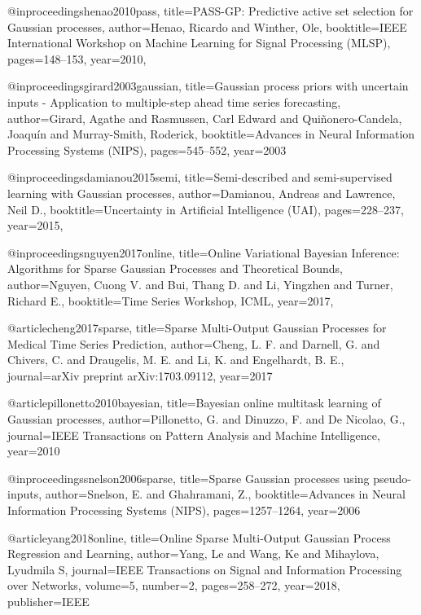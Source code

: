 \documentclass[]{article}
\begin{document}
@inproceedings{henao2010pass,
	title={{PASS-GP}: {P}redictive active set selection for {G}aussian processes},
	author={Henao, Ricardo and Winther, Ole},
	booktitle={IEEE International Workshop on Machine Learning for Signal Processing (MLSP)},
	pages={148--153},
	year={2010},
}

@inproceedings{girard2003gaussian,
	title={{G}aussian process priors with uncertain inputs - {A}pplication to multiple-step ahead time series forecasting},
	author={Girard, Agathe and Rasmussen, Carl Edward and Qui\~nonero-Candela, Joaqu\'in and Murray-Smith, Roderick},
	booktitle={Advances in Neural Information Processing Systems (NIPS)},
	pages={545--552},
	year={2003}
}

@inproceedings{damianou2015semi,
	title={{S}emi-described and semi-supervised learning with {G}aussian processes},
	author={Damianou, Andreas and Lawrence, Neil D.},
	booktitle={Uncertainty in Artificial Intelligence (UAI)},
	pages={228--237},
	year={2015},
}

@inproceedings{nguyen2017online,
	title={{O}nline Variational {B}ayesian Inference: Algorithms for Sparse {G}aussian Processes and Theoretical Bounds},
	author={Nguyen, Cuong V. and Bui, Thang D. and Li, Yingzhen and Turner, Richard E.},
	booktitle={Time Series Workshop, ICML},
	year={2017},
}

@article{cheng2017sparse,
	title={Sparse Multi-Output {G}aussian Processes for Medical Time Series Prediction},
	author={Cheng, L. F. and Darnell, G. and Chivers, C. and Draugelis, M. E. and Li, K. and Engelhardt, B. E.},
	journal={arXiv preprint arXiv:1703.09112},
	year={2017}
}

@article{pillonetto2010bayesian,
	title={{B}ayesian online multitask learning of {G}aussian processes},
	author={Pillonetto, G. and Dinuzzo, F. and De Nicolao, G.},
	journal={IEEE Transactions on Pattern Analysis and Machine Intelligence},
	year={2010}
}

@inproceedings{snelson2006sparse,
	title={{S}parse {G}aussian processes using pseudo-inputs},
	author={Snelson, E. and Ghahramani, Z.},
	booktitle={Advances in Neural Information Processing Systems (NIPS)},
	pages={1257--1264},
	year={2006}
}

@article{yang2018online,
	title={Online Sparse Multi-Output {G}aussian Process Regression and Learning},
	author={Yang, Le and Wang, Ke and Mihaylova, Lyudmila S},
	journal={IEEE Transactions on Signal and Information Processing over Networks},
  	volume={5},
	number={2},
	pages={258--272},
	year={2018},
	publisher={IEEE}
}
\end{document}
